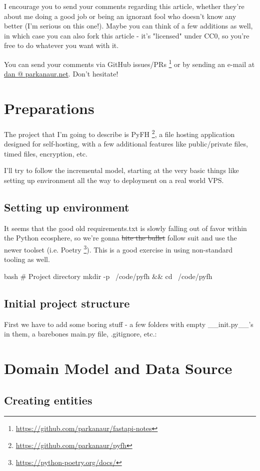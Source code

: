 \documentclass[14pt]{extarticle}
\newcommand{\flink}[1]{\footnote{\href{#1}{#1}}}
\begin{document}
I encourage you to send your comments regarding this article, whether they're about me doing a good job or being an ignorant fool who doesn't know any better (I'm serious on this one!). Maybe you can think of a few additions as well, in which case you can also fork this article - it's "licensed" under CC0, so you're free to do whatever you want with it.

You can send your comments via GitHub issues/PRs \flink{https://github.com/parkanaur/fastapi-notes} or by sending an e-mail at {\href{mailto:dan@parkanaur.net}{dan @ parkanaur.net}}. Don't hesitate!

\section{Preparations}

The project that I'm going to describe is PyFH \flink{https://github.com/parkanaur/pyfh}, a file hosting application designed for self-hosting, with a few additional features like public/private files, timed files, encryption, etc.

I'll try to follow the incremental model, starting at the very basic things like setting up environment all the way to deployment on a real world VPS.

\subsection{Setting up environment}

It seems that the good old requirements.txt is slowly falling out of favor within the Python ecosphere, so we're gonna \sout{bite the bullet} follow suit and use the newer toolset (i.e. Poetry \flink{https://python-poetry.org/docs/}). This is a good exercise in using non-standard tooling as well.

\begin{code}{bash}
    # Project directory
    mkdir -p ~/code/pyfh && cd ~/code/pyfh
\end{code}

\subsection{Initial project structure}
First we have to add some boring stuff - a few folders with empty \_\_init.py\_\_'s in them, a barebones main.py file, .gitignore, etc.:

\section{Domain Model and Data Source}

\subsection{Creating entities}
\end{document}
